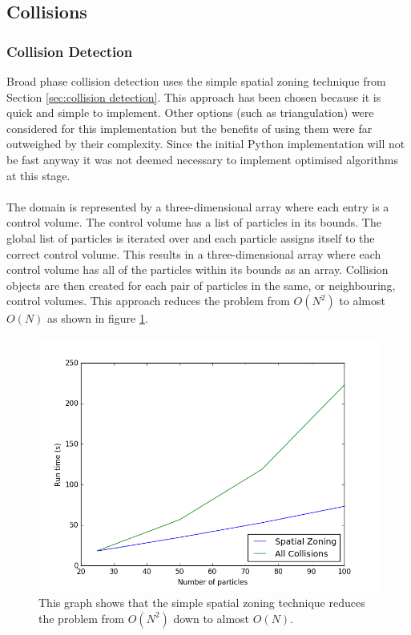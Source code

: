 \documentclass[a4paper,11pt,titlepage]{report}
\begin{document}
\subsection{Collisions}
\subsubsection{Collision Detection}
\label{sec:Python Collision Detection}
Broad phase collision detection uses the simple spatial zoning technique from Section \ref{sec:collision detection}. This approach has been chosen because it is quick and simple to implement. Other options (such as triangulation\cite{dynamictriangulations}) were considered for this implementation but the benefits of using them were far outweighed by their complexity. Since the initial Python implementation will not be fast anyway it was not deemed necessary to implement optimised algorithms at this stage.
\\\\The domain is represented by a three-dimensional array where each entry is a control volume. The control volume has a list of particles in its bounds. The global list of particles is iterated over and each particle assigns itself to the correct control volume. This results in a three-dimensional array where each control volume has all of the particles within its bounds as an array. Collision objects are then created for each pair of particles in the same, or neighbouring, control volumes. This approach reduces the problem from $O(N^{2})$ to almost $O(N)$ as shown in figure \ref{fig:run_time_against_N_python}.
\begin{figure}[!ht]
\centering
\includegraphics[scale=0.65]{figures/RunTimeAgainstNumberOfParticlesPython.png}
\caption{This graph shows that the simple spatial zoning technique reduces the problem from $O(N^{2})$ down to almost $O(N)$.}
\label{fig:run_time_against_N_python}
\end{figure}
\end{document}
